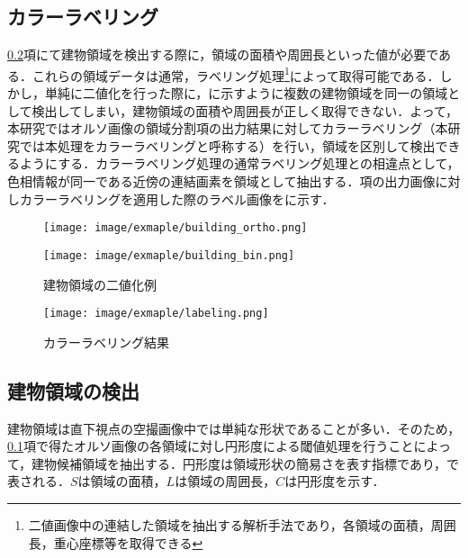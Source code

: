     \subsection{カラーラベリング}
      \label{カラーラベリング}
      \ref{建物領域の検出}項にて建物領域を検出する際に，領域の面積や周囲長といった値が必要である．これらの領域データは通常，ラベリング処理\footnote{二値画像中の連結した領域を抽出する解析手法であり，各領域の面積，周囲長，重心座標等を取得できる}によって取得可能である．しかし，単純に二値化を行った際に，に示すように複数の建物領域を同一の領域として検出してしまい，建物領域の面積や周囲長が正しく取得できない．よって，本研究では{オルソ画像の領域分割}項の出力結果に対してカラーラベリング（本研究では本処理をカラーラベリングと呼称する）を行い，領域を区別して検出できるようにする．カラーラベリング処理の通常ラベリング処理との相違点として，色相情報が同一である近傍の連結画素を領域として抽出する．項の出力画像に対しカラーラベリングを適用した際のラベル画像をに示す．

      \begin{figure}[t]
        \begin{minipage}[c]{0.45\hsize}
          \centering
          \texttt{[image: image/exmaple/building\_ortho.png]}
        \end{minipage}
        \begin{minipage}[c]{0.45\hsize}
          \centering
          \texttt{[image: image/exmaple/building\_bin.png]}
        \end{minipage}
        \caption{建物領域の二値化例}
        \label{建物領域の二値化例}
      \end{figure}

      \begin{figure}[t]
        \centering
        \texttt{[image: image/exmaple/labeling.png]}
        \caption{カラーラベリング結果}
        \label{カラーラベリング結果}
      \end{figure}


    \subsection{建物領域の検出}
      \label{建物領域の検出}
      建物領域は直下視点の空撮画像中では単純な形状であることが多い．そのため，\ref{カラーラベリング}項で得たオルソ画像の各領域に対し円形度による閾値処理を行うことによって，建物候補領域を抽出する．円形度は領域形状の簡易さを表す指標であり，で表される．$S$は領域の面積，$L$は領域の周囲長，$C$は円形度を示す．


